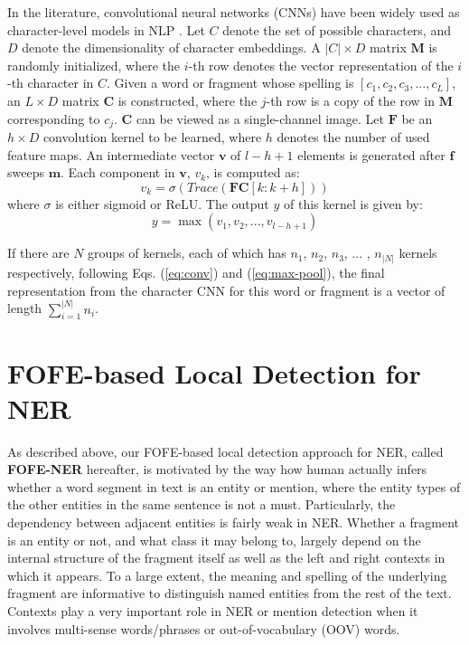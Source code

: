\documentclass[11pt,a4paper]{article}
\begin{document}
In the literature, convolutional neural networks (CNNs) have been widely used as character-level models in NLP \cite{kim2015character}. 
Let $C$ denote the set of possible characters, and $D$ denote the dimensionality of character embeddings.
A $|C| \times D$ matrix $\bm{M}$ is randomly initialized, where the $i$-th row denotes the vector representation of the $i$-th character in $C$. Given a word or fragment whose spelling is $[c_1, c_2, c_3, ..., c_L]$, 
an $L \times D$ matrix $\bm{C}$ is constructed,  where the $j$-th row is a copy of the row in  $\bm{M}$ corresponding to $c_j$. $\bm{C}$ can be viewed as a single-channel image. 
Let $\bm{F}$ be an $h \times D$ convolution kernel to be learned,  where $h$ denotes the number of used feature maps. 
An intermediate vector $\bm{v}$ of $l-h+1$ elements is generated after $\bm{f}$ sweeps $\bm{m}$. Each component in $\bm{v}$,  $v_k$,  is computed as:
\begin{equation}
\label{eq:conv}
v_k = \sigma(Trace(\bm{F}\bm{C}[k:k+h]))
\end{equation}
where $\sigma$ is either sigmoid or ReLU.
The output  $y$ of this kernel is given by:
\begin{equation}
\label{eq:max-pool}
y = \max(v_1, v_2, ..., v_{l-h+1})
\end{equation}

If there are $N$ groups of kernels, each of which has $n_1$, $n_2$, $n_3$, ... , ${n_{|N|}}$ kernels respectively,
following Eqs. (\ref{eq:conv}) and (\ref{eq:max-pool}), the final representation from the character CNN for this word or fragment is a vector of length $\sum_{i=1}^{|N|} n_{i}$.

\section{FOFE-based Local Detection for NER}

As described above, our FOFE-based local detection approach for NER, called  \textbf{FOFE-NER} hereafter, 
is motivated by the way how human actually infers whether a word segment in text is an entity or mention, where  
the entity types of the other entities in the same sentence is not a must.
Particularly, the dependency between adjacent entities is fairly weak in NER. 
Whether a fragment is an entity or not, and what class it may belong to, largely depend on
the internal structure of the fragment itself as well as the left and right contexts  in which it appears. 
To a large extent, the meaning and spelling of the underlying fragment 
are informative to distinguish named entities from the rest of the text. 
Contexts play a very important role in NER or mention detection 
when it involves multi-sense words/phrases or out-of-vocabulary (OOV) words. 
\end{document}
